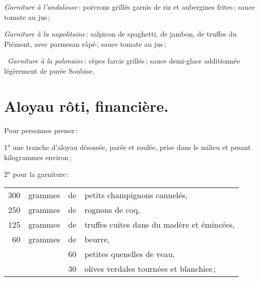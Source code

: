 \textit{Garniture à l'andalouse} : poivrons grillés garnis de riz et aubergines
frites ; sauce tomate au jus ;

\medskip

\textit{Garniture à la napolitaine} : salpicon de spaghetti, de jambon, de
truffes du Piémont, avec parmesan râpé ; sauce tomate au jus ;

\medskip

\textit{Garniture à la polonaise} : cèpes farcis grillés ; sauce demi-glace
additionnée légèrement de purée Soubise.

\section*{\centering Aloyau rôti, financière.}
{}

Pour {\mmm} personnes prenez :

\medskip

1° une tranche d'aloyau désossée, parée et roulée, prise dans le milieu et
pesant {\mmm} kilogrammes environ ;

\medskip

2° pour la garniture :

\medskip

\footnotesize
\begin{longtable}{rrrp{16em}}
    300 & grammes & de & petits champignons cannelés,                                                     \\
    250 & grammes & de & rognons de coq,                                                                  \\
    125 & grammes & de & truffes cuites dans du madère et émincées,                                       \\
     60 & grammes & de & beurre,                                                                          \\
        &         & 60 & petites quenelles de veau,                                                       \\
        &         & 30 & olives verdales tournées et blanchies ;                                          \\
\end{longtable}
\normalsize

